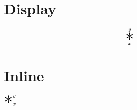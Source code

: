 \documentclass{article}
\newcommand{\bigstar}{\mathop{\Huge \mathlarger{\mathlarger{*}}}}
\begin{document}
\section{Display}

\[ \bigstar_{x}^{y} \]


\section{Inline}

\( \bigstar_{x}^{y}\)
\end{document}
